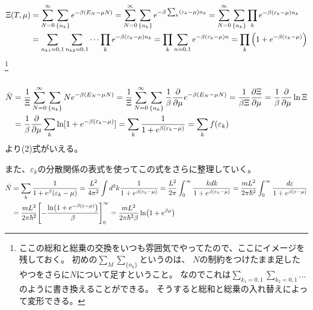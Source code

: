 \documentclass[../../master.tex]{subfiles}
\begin{document}
\subsection{}
\begin{equation}\begin{aligned}[b]
    \Xi(T,\mu)
    &= \sum_{N=0}^{\infty}\sum_{\{n_k\}}e^{-\beta(E_N-\mu N)}
    = \sum_{N=0}^{\infty}\sum_{\{n_k\}}e^{-\beta\sum_k(\varepsilon_k-\mu)n_k}
    = \sum_{N=0}^{\infty}\sum_{\{n_k\}}\prod_k e^{-\beta(\varepsilon_k-\mu)n_k}\\
    &= \sum_{n_{k1}=0,1}\sum_{n_{k2}=0,1}\cdots \prod_k e^{-\beta(\varepsilon_k-\mu)n_k}
    = \prod_k \sum_{n=0,1}e^{-\beta(\varepsilon_k-\mu)n}
    = \prod_k \qty(1+e^{-\beta(\varepsilon_k-\mu)})
\end{aligned}\end{equation}
\footnote{
    ここの総和と総乗の交換をいつも雰囲気でやってたので、ここにイメージを残しておく。
    初めの\(\sum_M\sum_{\{n_k\}}\)というのは、
    \(N\)の制約をつけたまま足したやつをさらに\(N\)について足すということ。
    なのでこれは\(\sum_{k_1=0,1}\sum_{k_2=0,1}\ldots\)のように書き換えることができる。
    そうすると総和と総乗の入れ替えによって変形できる。
}
\subsection{}
\begin{equation}\begin{aligned}[b]
    \bar{N}
    &= \frac{1}{\Xi}\sum_{N=0}^{\infty}\sum_{\{n_k\}}Ne^{-\beta(E_N-\mu N)}
    = \frac{1}{\Xi}\sum_{N=0}^{\infty}\sum_{\{n_k\}}\frac{1}{\beta}\pdv{\mu}e^{-\beta(E_N-\mu N)}
    = \frac{1}{\beta\Xi}\pdv{\Xi}{\mu}
    = \frac{1}{\beta}\pdv{\mu}\ln\Xi\\
    &=  \frac{1}{\beta}\pdv{\mu}\sum_k\ln[1+e^{-\beta(\varepsilon_k-\mu)}]
    = \sum_k \frac{1}{1+e^{\beta(\varepsilon_k-\mu)}} = \sum_kf(\varepsilon_k)
\end{aligned}\end{equation}
より(2)式がいえる。

また、\(\varepsilon_k\)の分散関係の表式を使ってこの式をさらに整理していく。
\begin{equation}\begin{aligned}[b]
    \bar{N}
    &= \sum_k \frac{1}{1+e^{\beta}(\varepsilon_k-\mu)}
    = \frac{L^2}{4\pi^2}\int d^2k \frac{1}{1+e^{\beta(\varepsilon_k-\mu)}}
    = \frac{L^2}{2\pi}\int_{0}^{\infty} \frac{kdk}{1+e^{\beta(\varepsilon_k-\mu)}}
    = \frac{mL^2}{2\pi\hbar^2}\int_{0}^{\infty} \frac{d\varepsilon}{1+e^{\beta(\varepsilon-\mu)}}\\
    &= \frac{mL^2}{2\pi\hbar^2}\qty[-\frac{\ln(1+e^{-\beta(\varepsilon-\mu)})}{\beta}]_0^{\infty}
    = \frac{mL^2}{2\pi\hbar^2\beta}\ln(1+e^{\beta\mu})
\end{aligned}\end{equation}
\end{document}
